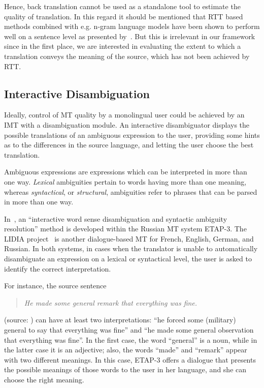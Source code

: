\documentclass[hidelinks,10pt,letter]{article} %
\begin{document}
      Hence, back translation cannot be used as a standalone tool to estimate the quality of translation.
      In this regard it should be mentioned that RTT based methods combined with e.g. n-gram language models have been shown
      to perform well on a sentence level
      as presented by~\cite{rapp2009back,jiang2012naive}. But this is irrelevant in our framework since in the first place,
      we are interested in evaluating the extent to which
      a translation conveys the meaning of the source, which has not been achieved by RTT.
      
      \subsection{Interactive Disambiguation}\label{sec:exist}
      Ideally, control of MT quality by a monolingual user could be achieved 
      by an IMT with a disambiguation module. An interactive disambiguator
      displays the possible translations of an ambiguous
      expression to the user, 
      providing some hints as to the differences in the source language, and 
      letting the user choose the best translation. 
      
      Ambiguous expressions are expressions which can 
      be interpreted in more than one way. \textit{Lexical} ambiguities
      pertain to words having more than one meaning, whereas \textit{syntactical}, or \textit{structural}, ambiguities refer to phrases that
      can be parsed in more than one way.
      
      In~\cite{boguslavsky2005interactive}, an ``interactive word sense disambiguation and syntactic ambiguity resolution'' method is developed within the Russian MT system ETAP-3. 
      The LIDIA project~\cite{boitet1994multilingual,blanchon2003two} is
      another dialogue-based MT for French, English, German, and Russian. 
      In both systems, in cases when the translator is unable to automatically disambiguate 
      an expression on a lexical or syntactical level, the user is asked to
      identify the correct interpretation. 
      
      For instance, the source sentence
      \begin{quote}\textit{He made some general remark that everything was fine.}\end{quote}
      (source: \cite{boguslavsky2005interactive}) can have at least two interpretations: ``he forced some (military) general to say that everything was fine'' and 
      ``he made some general observation that everything was fine''. In the first case, the word ``general'' is a noun, while in the latter case it is an adjective;
      also, the words ``made'' and ``remark'' appear with two different meanings. In this case, ETAP-3 offers a dialogue that
      presents the possible meanings of those words to the user in her language, and she can choose the right meaning. 
      
\end{document}

